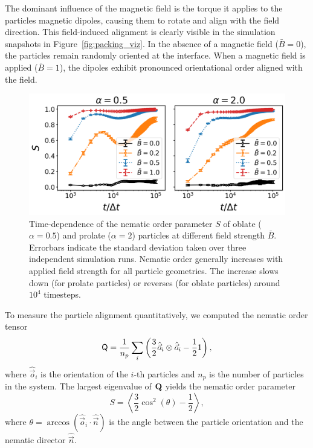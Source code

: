 The dominant influence of the magnetic field is the torque it applies to the particles magnetic dipoles, causing them to rotate and align with the 
field direction. This field-induced alignment is clearly visible in the simulation snapshots in Figure~\ref{fig:packing_viz}. In the absence of a 
magnetic field (\(\bar{B} = 0\)), the particles remain randomly oriented at the interface. When a magnetic field is applied (\(\bar{B} = 1\)), the 
dipoles exhibit pronounced orientational order aligned with the field. 

    
    \begin{figure}
    \centering
    \includegraphics[width=\columnwidth]{../figures/results/paper1/S-vs-t.png}
    \caption{Time-dependence of the nematic order parameter $S$ of oblate ($\alpha=0.5$) and prolate ($\alpha=2$) particles at different field strength $\bar{B}$. Errorbars indicate the standard deviation taken over three independent simulation runs. Nematic order generally increases with applied field strength for all particle geometries. The increase slows down (for prolate particles) or reverses (for oblate particles) around $10^4$ timesteps.}
    \label{fig:nematic_time}
    \end{figure}
    
    To measure the particle alignment quantitatively, we computed the
    nematic order tensor \cite{veerman_phase_1992}
    \begin{equation}
    \tens{Q} = \frac{1}{n_p} \sum_i \left( \frac{3}{2} \hat{\vec{o}}_i \otimes \hat{\vec{o}}_i -\frac{1}{2}\mathsf{1} \right) ,
    \end{equation}
    where \(\hat{\vec{o}}_i\) is the orientation of the
    \(i\)-th particles and \(n_p\) is the number of particles in the system.
    The largest eigenvalue of \(\tens{Q}\) yields the nematic order
    parameter
    \begin{equation}
    S = \left\langle \frac{3}{2}\cos^2 (\theta) - \frac{1}{2} \right\rangle ,
    \end{equation}
    where
    \(\theta=\arccos(\hat{\vec{o}}_i\cdot\hat{\vec{n}})\) is the angle
    between the particle orientation and the nematic director
    \(\hat{\vec{n}}\).
    
